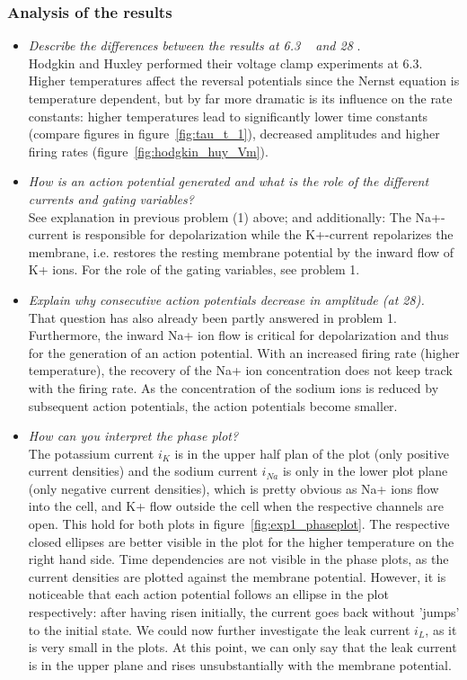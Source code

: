 \documentclass[
a4paper, 
12pt, 
]{article}
\begin{document}
\subsubsection{Analysis of the results}
\begin{itemize}
	\item \textit{Describe the differences between the results at 6.3 \textcelsius~ and 28 \textcelsius}.\\
	Hodgkin and Huxley performed their voltage clamp experiments at 6.3\textcelsius. Higher temperatures affect the reversal potentials since the Nernst equation is temperature dependent, but by far more dramatic is its influence on the rate constants: higher temperatures lead to significantly lower time constants (compare figures in figure~\ref{fig:tau_t_1}), decreased amplitudes and higher firing rates (figure~\ref{fig:hodgkin_huy_Vm}). 
	
	\item \textit{How is an action potential generated and what is the role of the different currents
and gating variables?}\\
	See explanation in previous problem (1) above; and additionally: The Na+-current is responsible for depolarization while the K+-current repolarizes the membrane, i.e. restores the resting membrane potential by the inward flow of K+ ions. For the role of the gating variables, see problem 1. 
	
	\item \textit{Explain why consecutive action potentials decrease in amplitude (at 28\textcelsius).}\\
	That question has also already been partly answered in problem 1. Furthermore, the inward Na+ ion flow is critical for depolarization and thus for the generation of an action potential. With an increased firing rate (higher temperature), the recovery of the Na+ ion concentration does not keep track with the firing rate. As the concentration of the sodium ions is reduced by subsequent action potentials, the action potentials become smaller. 
	
	
	\item \textit{How can you interpret the phase plot?}\\
	The potassium current $i_K$ is in the upper half plan of the plot (only positive current densities) and the sodium current $i_{Na}$ is only in the lower plot plane (only negative current densities), which is pretty obvious as Na+ ions flow into the cell, and K+ flow outside the cell when the respective channels are open. This hold for both plots in figure~\ref{fig:exp1_phaseplot}. The respective closed ellipses are better visible in the plot for the higher temperature on the right hand side. Time dependencies are not visible in the phase plots, as the current densities are plotted against the membrane potential. However, it is noticeable that each action potential follows an ellipse in the plot respectively: after having risen initially, the current goes back without 'jumps' to the initial state. We could now further investigate the leak current $i_L$, as it is very small in the plots. At this point, we can only say that the leak current is in the upper plane and rises unsubstantially with the membrane potential. 
	

\end{itemize}
\end{document}

